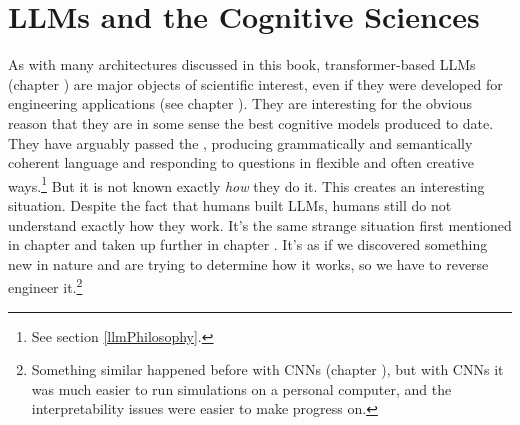\chapter{LLMs and the Cognitive Sciences}\label{ch_llm_cogsci}




As with many architectures discussed in this book, transformer-based LLMs (chapter ) are
major objects of scientific interest, even if they were developed for
engineering applications (see chapter ). They are
interesting for the obvious reason that they are in some sense the best
cognitive models produced to date. They have arguably passed the ,
producing grammatically and semantically coherent language and responding to
questions in flexible and often creative ways.\footnote{See section \ref{llmPhilosophy}.} But it is
not known exactly \emph{how} they do it. This creates an interesting situation.
Despite the fact that humans built LLMs, humans still do not understand exactly
how they work. It's the same strange situation first mentioned in chapter
 and taken up further in chapter
. It's as if we discovered something new in nature and
are trying to determine how it works, so we have to  reverse engineer
it.\footnote{Something similar happened before with CNNs (chapter
), but with CNNs it was much easier to run simulations on a
personal computer, and the interpretability issues were easier to make progress
on.}

